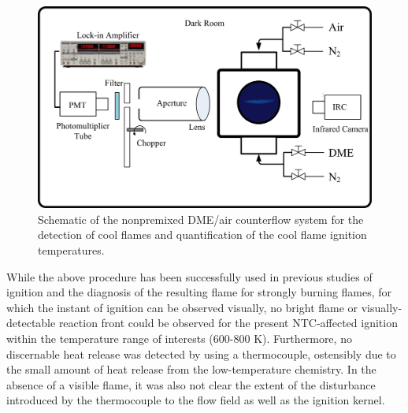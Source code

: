 \begin{figure}[t]
  \centering
  \scriptsize
  \includegraphics[width=1.0\textwidth]{ch-NTC/Experimental_Setup.png}
  \normalsize
  \caption{Schematic of the nonpremixed DME/air counterflow system for the detection of cool flames and quantification of the cool flame ignition temperatures.}
  \label{fig:NTC-setup}
\end{figure}


While the above procedure has been successfully used in previous studies of ignition and the diagnosis of the resulting flame for strongly burning flames, for which the instant of ignition can be observed visually, no bright flame or visually-detectable reaction front could be observed for the present NTC-affected ignition within the temperature range of interests ($600$-$800$ K).  Furthermore, no discernable heat release was detected by using a thermocouple, ostensibly due to the small amount of heat release from the low-temperature chemistry.  In the absence of a visible flame, it was also not clear the extent of the disturbance introduced by the thermocouple to the flow field as well as the ignition kernel.

